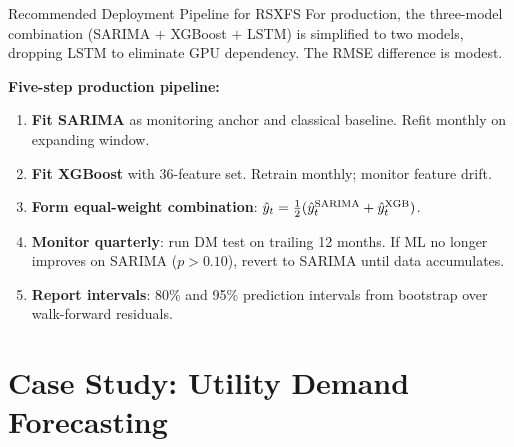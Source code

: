 \documentclass[aspectratio=169, 10pt]{beamer}
\begin{document}
\begin{frame}{Recommended Deployment Pipeline for RSXFS}
  {\small For production, the three-model combination (SARIMA $+$ XGBoost $+$ LSTM)
  is simplified to two models, dropping LSTM to eliminate GPU dependency.
  The RMSE difference is modest.}
  \vspace{0.1cm}
  \begin{keybox}
    {\small \textbf{Five-step production pipeline:}
    \begin{enumerate}\setlength{\itemsep}{3pt}
      \item \textbf{Fit SARIMA} as monitoring anchor and classical baseline.
            Refit monthly on expanding window.
      \item \textbf{Fit XGBoost} with 36-feature set.
            Retrain monthly; monitor feature drift.
      \item \textbf{Form equal-weight combination}:
            $\hat{y}_t = \tfrac{1}{2}(\hat{y}_t^{\text{SARIMA}}
            + \hat{y}_t^{\text{XGB}})$.
      \item \textbf{Monitor quarterly}: run DM test on trailing 12 months.
            If ML no longer improves on SARIMA ($p > 0.10$), revert to
            SARIMA until data accumulates.
      \item \textbf{Report intervals}: 80\% and 95\% prediction intervals
            from bootstrap over walk-forward residuals.
    \end{enumerate}
    }
  \end{keybox}
\end{frame}

\section{Case Study: Utility Demand Forecasting}

\end{document}
